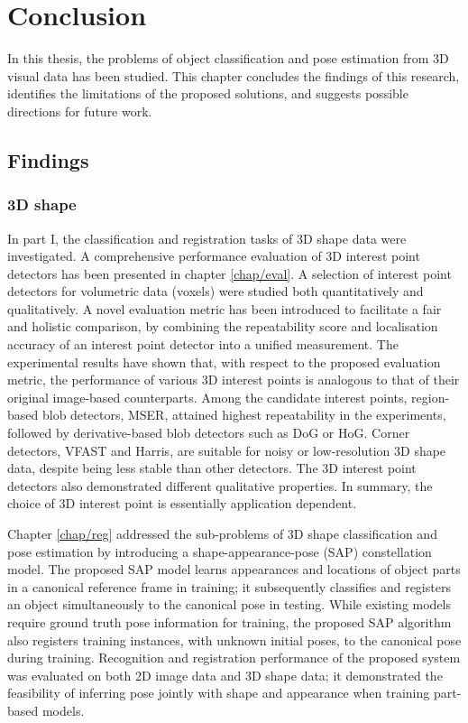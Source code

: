 \chapter{Conclusion}
\label{chap/conradient}

In this thesis, the problems of object classification and pose estimation from 3D visual data has been studied. This chapter concludes the findings of this research, identifies the limitations of the proposed solutions, and suggests possible directions for future work.  

\section{Findings}

\subsection{3D shape}

In part I, the classification and registration tasks of 3D shape data were investigated. A comprehensive performance evaluation of 3D interest point detectors has been presented in chapter \ref{chap/eval}. A selection of interest point detectors for volumetric data (voxels) were studied both quantitatively and qualitatively. A novel evaluation metric has been introduced to facilitate a fair and holistic comparison, by combining the repeatability score and localisation accuracy of an interest point detector into a unified measurement. The experimental results have shown that, with respect to the proposed evaluation metric, the performance of various 3D interest points is analogous to that of their original image-based counterparts. Among the candidate interest points, region-based blob detectors, \eg MSER, attained highest repeatability in the experiments, followed by derivative-based blob detectors such as DoG or HoG. Corner detectors, \eg VFAST and Harris, are suitable for noisy or low-resolution 3D shape data, despite being less stable than other detectors. The 3D interest point detectors also demonstrated different qualitative properties. In summary, the choice of 3D interest point is essentially application dependent. 

Chapter \ref{chap/reg} addressed the sub-problems of 3D shape classification and pose estimation by introducing a shape-appearance-pose (SAP) constellation model. The proposed SAP model learns appearances and locations of object parts in a canonical reference frame in training; it subsequently classifies and registers an object simultaneously to the canonical pose in testing. While existing models require ground truth pose information for training, the proposed SAP algorithm also registers training instances, with unknown initial poses, to the canonical pose during training. Recognition and registration performance of the proposed system was evaluated on both 2D image data and 3D shape data; it demonstrated the feasibility of inferring pose jointly with shape and appearance when training part-based models. 

